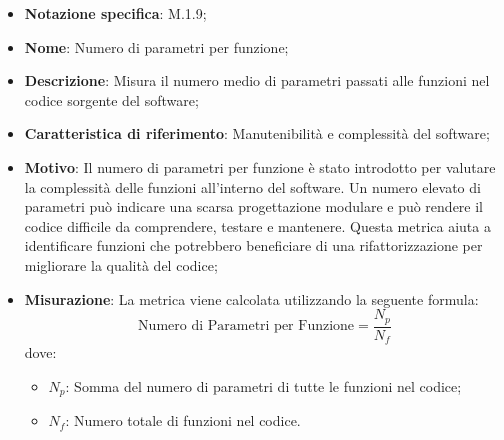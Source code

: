 \begin{itemize}
    \item \textbf{Notazione specifica}: M.1.9;
    \item \textbf{Nome}: Numero di parametri per funzione;
    \item \textbf{Descrizione}: Misura il numero medio di parametri passati alle funzioni nel codice sorgente del software;
    \item \textbf{Caratteristica di riferimento}: Manutenibilità e complessità del software;
    \item \textbf{Motivo}: Il numero di parametri per funzione è stato introdotto per valutare la complessità delle funzioni all'interno del software. Un numero elevato di parametri può indicare una scarsa progettazione modulare e può rendere il codice difficile da comprendere, testare e mantenere. Questa metrica aiuta a identificare funzioni che potrebbero beneficiare di una rifattorizzazione per migliorare la qualità del codice;
    \item \textbf{Misurazione}: La metrica viene calcolata utilizzando la seguente formula:
    \[
    \text{Numero di Parametri per Funzione} = \frac{N_{p}}{N_{f}}
    \]
    dove:
    \begin{itemize}
        \item $N_{p}$: Somma del numero di parametri di tutte le funzioni nel codice;
        \item $N_{f}$: Numero totale di funzioni nel codice.
    \end{itemize}
\end{itemize}

